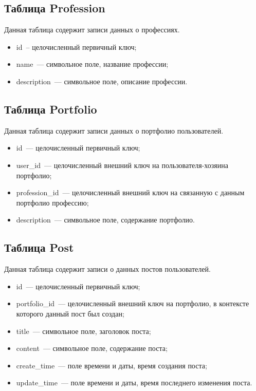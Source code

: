 \subsection{Таблица Profession}%
\label{sub:tablitsa_profession}
Данная таблица содержит записи данных о профессиях.
\begin{itemize}
    \item id~-- целочисленный первичный ключ;
    \item name~--- символьное поле, название профессии;
    \item description~--- символьное поле, описание профессии.
\end{itemize}

\subsection{Таблица Portfolio}%
\label{sub:tablitsa_portfolio}
Данная таблица содержит записи данных о портфолио пользователей.
\begin{itemize}
    \item id~--- целочисленный первичный ключ;
    \item user\_id~--- целочисленный внешний ключ на пользователя-хозяина портфолио;
    \item profession\_id~--- целочисленный внешний ключ на связанную с данным портфолио профессию;
    \item description~--- символьное поле, содержание портфолио.
\end{itemize}

\subsection{Таблица Post}%
\label{sub:tablitsa_post}
Данная таблица содержит записи о данных постов пользователей.
\begin{itemize}
    \item id~--- целочисленный первичный ключ;
    \item portfolio\_id~--- целочисленный внешний ключ на портфолио, в контексте которого данный пост был создан;
    \item title~--- символьное поле, заголовок поста;
    \item content~--- символьное поле, содержание поста;
    \item create\_time~--- поле времени и даты, время создания поста;
    \item update\_time~--- поле времени и даты, время последнего изменения поста.
\end{itemize}


